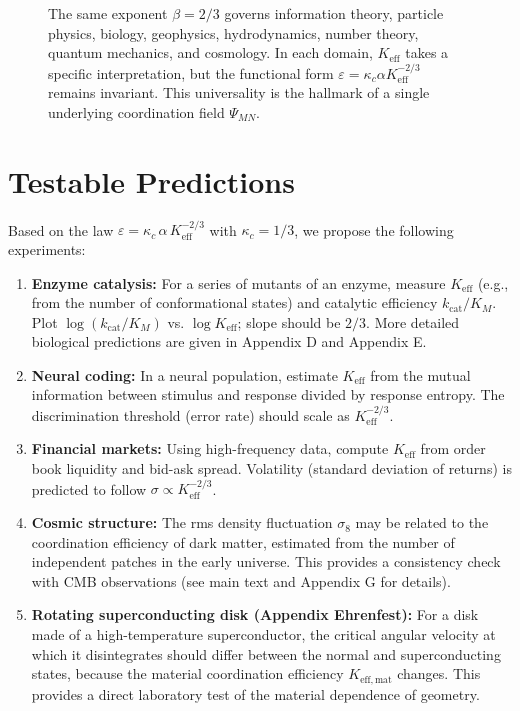 \documentclass[12pt]{article}
\newcommand{\Keff}{K_{\mathrm{eff}}}
\newcommand{\eps}{\varepsilon}
\newcommand{\kappac}{\kappa_c}
\begin{document}
\begin{figure}[H]
		\caption{The same exponent \(\beta = 2/3\) governs information theory, particle physics, biology, geophysics, hydrodynamics, number theory, quantum mechanics, and cosmology. In each domain, \(K_{\mathrm{eff}}\) takes a specific interpretation, but the functional form \(\varepsilon = \kappa_c \alpha K_{\mathrm{eff}}^{-2/3}\) remains invariant. This universality is the hallmark of a single underlying coordination field \(\Psi_{MN}\).}
		\label{fig:unified-beta}
	\end{figure}
	
	
	\section{Testable Predictions}
	\label{sec:predictions}
	
	Based on the law \(\eps = \kappac\,\alpha\,\Keff^{-2/3}\) with \(\kappac = 1/3\), we propose the following experiments:
	
	\begin{enumerate}
		\item \textbf{Enzyme catalysis:} For a series of mutants of an enzyme, measure \(\Keff\) (e.g., from the number of conformational states) and catalytic efficiency \(k_{\text{cat}}/K_M\). Plot \(\log(k_{\text{cat}}/K_M)\) vs. \(\log \Keff\); slope should be \(2/3\). More detailed biological predictions are given in Appendix D and Appendix E.
		\item \textbf{Neural coding:} In a neural population, estimate \(\Keff\) from the mutual information between stimulus and response divided by response entropy. The discrimination threshold (error rate) should scale as \(\Keff^{-2/3}\).
		\item \textbf{Financial markets:} Using high-frequency data, compute \(\Keff\) from order book liquidity and bid-ask spread. Volatility (standard deviation of returns) is predicted to follow \(\sigma \propto \Keff^{-2/3}\).
		\item \textbf{Cosmic structure:} The rms density fluctuation \(\sigma_8\) may be related to the coordination efficiency of dark matter, estimated from the number of independent patches in the early universe. This provides a consistency check with CMB observations (see main text and Appendix G for details).
		\item \textbf{Rotating superconducting disk (Appendix Ehrenfest):} For a disk made of a high-temperature superconductor, the critical angular velocity at which it disintegrates should differ between the normal and superconducting states, because the material coordination efficiency \(K_{\mathrm{eff,mat}}\) changes. This provides a direct laboratory test of the material dependence of geometry.
	\end{enumerate}
	
\end{document}
